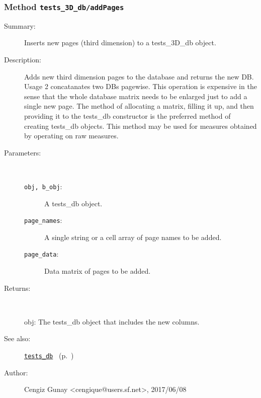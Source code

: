 \subsubsection[Method \texttt{addPages}]{Method \texttt{tests\_3D\_db/addPages}}%
%
\label{ref_tests_3D_db__addPages}%
\hypertarget{ref_tests_3D_db__addPages}{}%
\begin{description}
\item[Summary:]Inserts new pages (third dimension) to a tests\_3D\_db object.
%
%
\item[Description:]%
Adds new third dimension pages to the database and returns the new DB.
 Usage 2 concatanates two DBs pagewise. This operation is 
 expensive in the sense that the whole database matrix needs to be 
 enlarged just to add a single new page. The method of allocating
 a matrix, filling it up, and then providing it to the tests\_db 
 constructor is the preferred method of creating tests\_db objects. 
 This method may be used for measures obtained by operating on raw measures.
\item[Parameters:]~
\begin{description}%
\item[\texttt{obj, b\_obj}:]
 A tests\_db object.
\item[\texttt{page\_names}:]
 A single string or a cell array of page names to be added.
\item[\texttt{page\_data}:]
 Data matrix of pages to be added.
\end{description}%
%
\item[Returns:
]~

   obj: The tests\_db object that includes the new columns.
%
%
\item[See also:]%
\hyperlink{ref_tests_db}{\texttt{tests\_db}}%
\ (p.~\pageref{ref_tests_db})%
%
%
\item[Author:]%
Cengiz Gunay <cengique@users.sf.net>, 2017/06/08
%
\end{description}
\methodline%
